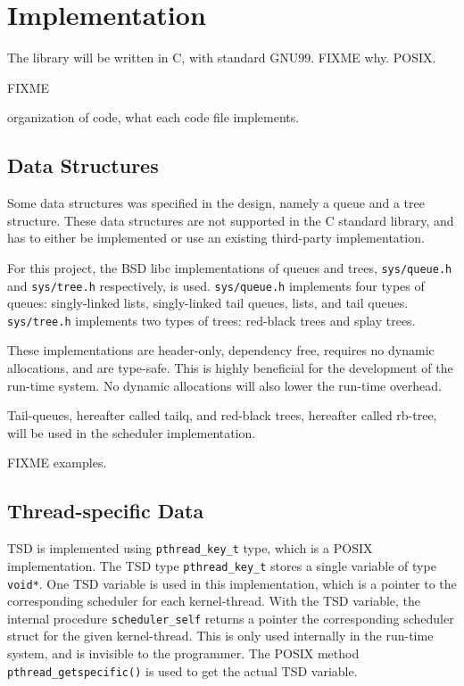 
\chapter{Implementation}
\label{ch:implementation}

The library will be written in C, with standard GNU99. FIXME why. POSIX.


FIXME

organization of code, what each code file implements.  

\section{Data Structures}

Some data structures was specified in the design, namely a queue and a tree structure. These data structures are not supported in the C standard library, and has to either be implemented or use an existing third\hyp{}party implementation.

For this project, the BSD libc implementations of queues and trees, \texttt{sys/queue.h} \citep{manqueue} and \texttt{sys/tree.h} \citep{mantree} respectively, is used. \texttt{sys/queue.h} implements four types of queues: singly\hyp{}linked lists, singly\hyp{}linked tail queues, lists, and tail queues. \texttt{sys/tree.h} implements two types of trees: red\hyp{}black trees and splay trees. 

These implementations are header\hyp{}only, dependency free, requires no dynamic allocations, and are type\hyp{}safe. This is highly beneficial for the development of the run\hyp{}time system. No dynamic allocations will also lower the run\hyp{}time overhead. 

Tail\hyp{}queues, hereafter called tailq, and red\hyp{}black trees, hereafter called rb\hyp{}tree, will be used in the scheduler implementation. 

FIXME examples.


\section{Thread\hyp{}specific Data}

TSD is implemented using \texttt{pthread\_key\_t} type, which is a POSIX implementation. The TSD type \texttt{pthread\_key\_t} stores a single variable of type \texttt{void*}. One TSD variable is used in this implementation, which is a pointer to the corresponding scheduler for each kernel\hyp{}thread. With the TSD variable, the internal procedure \texttt{scheduler\_self} returns a pointer the corresponding scheduler struct for the given kernel\hyp{}thread. This is only used internally in the run\hyp{}time system, and is invisible to the programmer. The POSIX method \texttt{pthread\_getspecific()} is used to get the actual TSD variable.

